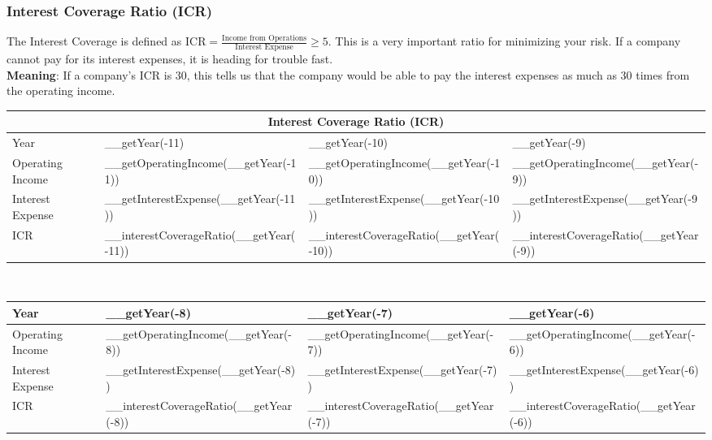 \subsubsection{Interest Coverage Ratio (ICR)}

The Interest Coverage is defined as
$\text{ICR} = \frac{\text{Income from Operations}}{\text{Interest Expense}} \geq 5$.
This is a very important ratio for minimizing your risk. If a company cannot pay
for its interest expenses, it is heading for trouble fast.\\
\textbf{Meaning}: If a company's ICR is $30$, this tells us that the company would
be able to pay the interest expenses as much as 30 times from the operating income.\\

\begin{tabularx}{\textwidth}{|X|X|X|X|}
 \hline
 \multicolumn{4}{|c|}{Interest Coverage Ratio (ICR)} \\
 \hline
 Year                      & __getYear(-11)                          & __getYear(-10)                          & __getYear(-9)                          \\
 \hline
 Operating Income          & __getOperatingIncome(__getYear(-11))    & __getOperatingIncome(__getYear(-10))    & __getOperatingIncome(__getYear(-9))    \\
 Interest Expense          & __getInterestExpense(__getYear(-11))    & __getInterestExpense(__getYear(-10))    & __getInterestExpense(__getYear(-9))    \\
 \rowcolor{lightgray} ICR  & __interestCoverageRatio(__getYear(-11)) & __interestCoverageRatio(__getYear(-10)) & __interestCoverageRatio(__getYear(-9)) \\
 \hline
\end{tabularx}\\

\begin{tabularx}{\textwidth}{|X|X|X|X|}
 \hline
 Year                      & __getYear(-8)                          & __getYear(-7)                          & __getYear(-6)                          \\
 \hline
 Operating Income          & __getOperatingIncome(__getYear(-8))    & __getOperatingIncome(__getYear(-7))    & __getOperatingIncome(__getYear(-6))    \\
 Interest Expense          & __getInterestExpense(__getYear(-8))    & __getInterestExpense(__getYear(-7))    & __getInterestExpense(__getYear(-6))    \\
 \rowcolor{lightgray} ICR  & __interestCoverageRatio(__getYear(-8)) & __interestCoverageRatio(__getYear(-7)) & __interestCoverageRatio(__getYear(-6)) \\
 \hline
\end{tabularx}\\

